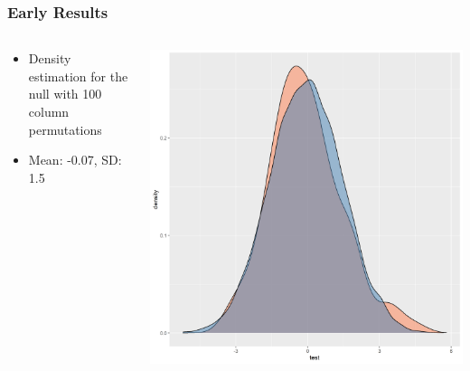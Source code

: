 \documentclass{beamer}
\begin{document}
\begin{frame}
    \frametitle{Early Results}
    \begin{columns}
        \begin{column}{0.5\textwidth}
            \begin{itemize}
                \item Density estimation for the null with 100 column permutations
                \item Mean: -0.07, SD: 1.5
            \end{itemize}
        \end{column}
        \begin{column}{0.5\textwidth}
            \begin{center}
                \includegraphics[scale=0.325]{figures/null_density.png}
            \end{center}
        \end{column}
    \end{columns}
\end{frame}
\end{document}
